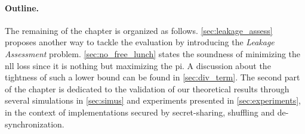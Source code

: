 \paragraph{Outline.}
The remaining of the chapter is organized as follows. 
\autoref{sec:leakage_assess} proposes another way to tackle the evaluation by introducing the \emph{Leakage Assessment} problem.
\autoref{sec:no_free_lunch} states the soundness of minimizing the \gls{nll} loss since it is nothing but maximizing the \gls{pi}.
A discussion about the tightness of such a lower bound can be found in \autoref{sec:div_term}.
The second part of the chapter is dedicated to the validation of our theoretical results through several simulations in \autoref{sec:simus} and experiments presented in \autoref{sec:experiments}, in the context of implementations secured by secret-sharing, shuffling and de-synchronization.